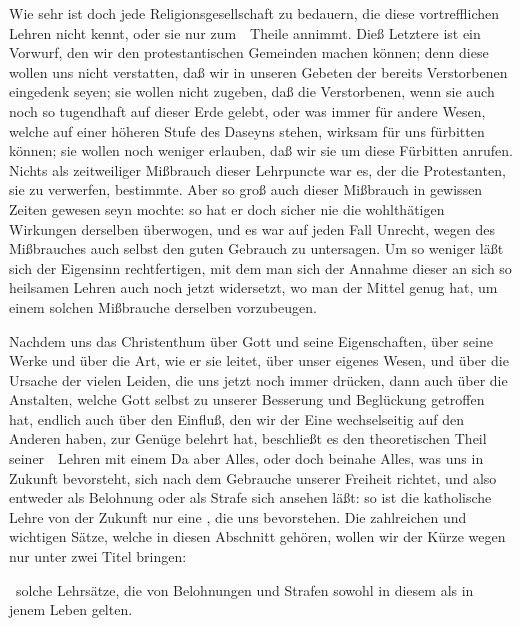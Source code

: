 Wie sehr ist doch jede Religionsgesellschaft zu bedauern, die diese vortrefflichen Lehren nicht kennt, oder sie nur zum~\ Theile annimmt. Dieß Letztere ist ein Vorwurf, den wir den protestantischen Gemeinden machen können; denn diese wollen uns nicht verstatten, daß wir in unseren Gebeten der bereits Verstorbenen eingedenk seyen; sie wollen nicht zugeben, daß die Verstorbenen, wenn sie auch noch so tugendhaft auf dieser Erde gelebt, oder was immer für andere Wesen, welche auf einer höheren Stufe des Daseyns stehen, wirksam für uns fürbitten können; sie wollen noch weniger erlauben, daß wir sie um diese Fürbitten anrufen. Nichts als zeitweiliger Mißbrauch dieser Lehrpuncte war es, der die Protestanten, sie zu verwerfen, bestimmte. Aber so groß auch dieser Mißbrauch in gewissen Zeiten gewesen seyn mochte: so hat er doch sicher nie die wohlthätigen Wirkungen derselben überwogen, und es war auf jeden Fall Unrecht, wegen des Mißbrauches auch selbst den guten Gebrauch zu untersagen. Um so weniger läßt sich der Eigensinn rechtfertigen, mit dem man sich der Annahme dieser an sich so heilsamen Lehren auch noch jetzt widersetzt, wo man der Mittel genug hat, um einem solchen Mißbrauche derselben vorzubeugen.

Nachdem uns das Christenthum über Gott und seine Eigenschaften, über seine Werke und über die Art, wie er sie leitet, über unser eigenes Wesen, und über die Ursache der vielen Leiden, die uns jetzt noch immer drücken, dann auch über die Anstalten, welche Gott selbst zu unserer Besserung und Beglückung getroffen hat, endlich auch über den Einfluß, den wir der Eine wechselseitig auf den Anderen haben, zur Genüge belehrt hat, beschließt es den theoretischen Theil seiner~\ Lehren mit einem  Da aber Alles, oder doch beinahe Alles, was uns in Zukunft bevorsteht, sich nach dem Gebrauche unserer Freiheit richtet, und also entweder als Belohnung oder als Strafe sich ansehen läßt: so ist die katholische Lehre von der Zukunft nur eine , die uns bevorstehen. Die zahlreichen und wichtigen Sätze, welche in diesen Abschnitt gehören, wollen wir der Kürze wegen nur unter zwei Titel bringen:
\begin{aufza}
\item {} \dh\ solche Lehrsätze, die von Belohnungen und Strafen sowohl in diesem als in jenem Leben gelten.
\item {}
\end{aufza}

